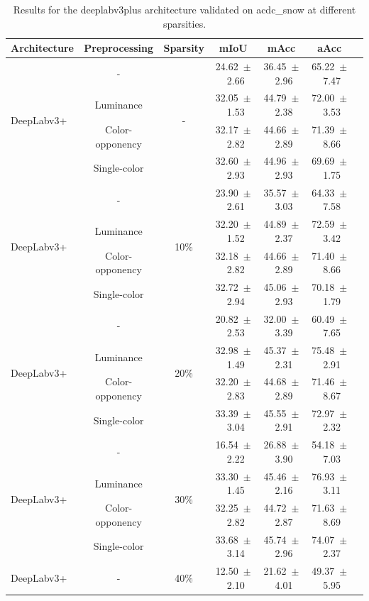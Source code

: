 \begin{table}[h]
\centering
\caption{Results for the deeplabv3plus architecture validated on acdc_snow at different sparsities.}
\begin{tabular}{@{}lccc ccc@{}}
\toprule
Architecture & Preprocessing & Sparsity & mIoU & mAcc & aAcc \\
\midrule

\multirow{4}{*}{DeepLabv3+} & - & \multirow{4}{*}{-} & 24.62~$\pm$~2.66 & 36.45~$\pm$~2.96 & 65.22~$\pm$~7.47 \\
& Luminance & & 32.05~$\pm$~1.53 & 44.79~$\pm$~2.38 & 72.00~$\pm$~3.53 \\
& Color-opponency & & 32.17~$\pm$~2.82 & 44.66~$\pm$~2.89 & 71.39~$\pm$~8.66 \\
& Single-color & & 32.60~$\pm$~2.93 & 44.96~$\pm$~2.93 & 69.69~$\pm$~1.75 \\
\midrule
\multirow{4}{*}{DeepLabv3+} & - & \multirow{4}{*}{10\%} & 23.90~$\pm$~2.61 & 35.57~$\pm$~3.03 & 64.33~$\pm$~7.58 \\
& Luminance & & 32.20~$\pm$~1.52 & 44.89~$\pm$~2.37 & 72.59~$\pm$~3.42 \\
& Color-opponency & & 32.18~$\pm$~2.82 & 44.66~$\pm$~2.89 & 71.40~$\pm$~8.66 \\
& Single-color & & 32.72~$\pm$~2.94 & 45.06~$\pm$~2.93 & 70.18~$\pm$~1.79 \\
\midrule
\multirow{4}{*}{DeepLabv3+} & - & \multirow{4}{*}{20\%} & 20.82~$\pm$~2.53 & 32.00~$\pm$~3.39 & 60.49~$\pm$~7.65 \\
& Luminance & & 32.98~$\pm$~1.49 & 45.37~$\pm$~2.31 & 75.48~$\pm$~2.91 \\
& Color-opponency & & 32.20~$\pm$~2.83 & 44.68~$\pm$~2.89 & 71.46~$\pm$~8.67 \\
& Single-color & & 33.39~$\pm$~3.04 & 45.55~$\pm$~2.91 & 72.97~$\pm$~2.32 \\
\midrule
\multirow{4}{*}{DeepLabv3+} & - & \multirow{4}{*}{30\%} & 16.54~$\pm$~2.22 & 26.88~$\pm$~3.90 & 54.18~$\pm$~7.03 \\
& Luminance & & 33.30~$\pm$~1.45 & 45.46~$\pm$~2.16 & 76.93~$\pm$~3.11 \\
& Color-opponency & & 32.25~$\pm$~2.82 & 44.72~$\pm$~2.87 & 71.63~$\pm$~8.69 \\
& Single-color & & 33.68~$\pm$~3.14 & 45.74~$\pm$~2.96 & 74.07~$\pm$~2.37 \\
\midrule
\multirow{4}{*}{DeepLabv3+} & - & \multirow{4}{*}{40\%} & 12.50~$\pm$~2.10 & 21.62~$\pm$~4.01 & 49.37~$\pm$~5.95 \\

\end{tabular}
\end{table}
